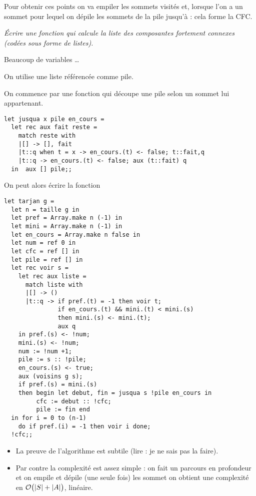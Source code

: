 Pour obtenir ces points on va empiler les sommets visités et, lorsque l'on a un sommet  pour lequel  on dépile les sommets de la pile jusqu'à  : cela forme la CFC.
\begin{Exercise}\it 
Écrire une fonction  qui calcule la liste des composantes fortement connexes (codées sous forme de listes).
\end{Exercise} 
\begin{Answer}
Beaucoup de variables \dots

On utilise une liste référencée comme pile.

On commence par une fonction qui découpe une pile selon un sommet lui appartenant.
\begin{lstlisting}
let jusqua x pile en_cours =
  let rec aux fait reste =
    match reste with
    |[] -> [], fait
    |t::q when t = x -> en_cours.(t) <- false; t::fait,q
    |t::q -> en_cours.(t) <- false; aux (t::fait) q
  in  aux [] pile;;
\end{lstlisting}

On peut alors écrire la fonction
\newpage
\begin{lstlisting}
let tarjan g = 
  let n = taille g in
  let pref = Array.make n (-1) in
  let mini = Array.make n (-1) in
  let en_cours = Array.make n false in
  let num = ref 0 in
  let cfc = ref [] in
  let pile = ref [] in 
  let rec voir s =
    let rec aux liste = 
      match liste with
      |[] -> ()
      |t::q -> if pref.(t) = -1 then voir t;
               if en_cours.(t) && mini.(t) < mini.(s) 
               then mini.(s) <- mini.(t);
               aux q 
    in pref.(s) <- !num;
    mini.(s) <- !num;
    num := !num +1;
    pile := s :: !pile;
    en_cours.(s) <- true;
    aux (voisins g s);
    if pref.(s) = mini.(s) 
    then begin let debut, fin = jusqua s !pile en_cours in 
         cfc := debut :: !cfc; 
         pile := fin end
  in for i = 0 to (n-1) 
    do if pref.(i) = -1 then voir i done;
  !cfc;;
\end{lstlisting}
\end{Answer} 
\begin{itemize}
    \item La preuve de l'algorithme est subtile (lire : je ne sais pas la faire).
    \item Par contre la complexité est assez simple : on fait un parcours en profondeur et on empile et dépile (une seule fois) les sommet on obtient une complexité en ${\cal O}\bigl(|S| + |A|\bigr)$, linéaire.
\end{itemize}

